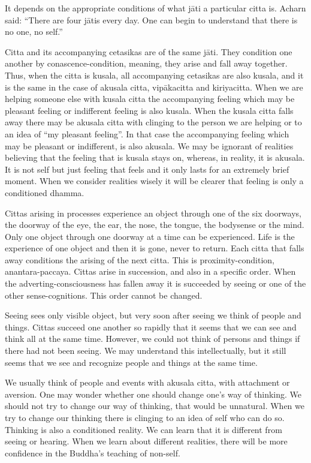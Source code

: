 It depends on the appropriate conditions of what jāti a particular citta
is. Acharn said: ``There are four jātis every day. One can begin to
understand that there is no one, no self.''

Citta and its accompanying cetasikas are of the same jāti. They
condition one another by conascence-condition, meaning, they arise and
fall away together. Thus, when the citta is kusala, all accompanying
cetasikas are also kusala, and it is the same in the case of akusala
citta, vipākacitta and kiriyacitta. When we are helping someone else
with kusala citta the accompanying feeling which may be pleasant feeling
or indifferent feeling is also kusala. When the kusala citta falls away
there may be akusala citta with clinging to the person we are helping or
to an idea of ``my pleasant feeling''. In that case the accompanying
feeling which may be pleasant or indifferent, is also akusala. We may be
ignorant of realities believing that the feeling that is kusala stays
on, whereas, in reality, it is akusala. It is not self but just feeling
that feels and it only lasts for an extremely brief moment. When we
consider realities wisely it will be clearer that feeling is only a
conditioned dhamma.

Cittas arising in processes experience an object through one of the six
doorways, the doorway of the eye, the ear, the nose, the tongue, the
bodysense or the mind. Only one object through one doorway at a time can
be experienced. Life is the experience of one object and then it is
gone, never to return. Each citta that falls away conditions the arising
of the next citta. This is proximity-condition, anantara-paccaya. Cittas
arise in succession, and also in a specific order. When the
adverting-consciousness has fallen away it is succeeded by seeing or one
of the other sense-cognitions. This order cannot be changed.

Seeing sees only visible object, but very soon after seeing we think of
people and things. Cittas succeed one another so rapidly that it seems
that we can see and think all at the same time. However, we could not
think of persons and things if there had not been seeing. We may
understand this intellectually, but it still seems that we see and
recognize people and things at the same time.

We usually think of people and events with akusala citta, with
attachment or aversion. One may wonder whether one should change one's
way of thinking. We should not try to change our way of thinking, that
would be unnatural. When we try to change our thinking there is clinging
to an idea of self who can do so. Thinking is also a conditioned
reality. We can learn that it is different from seeing or hearing. When
we learn about different realities, there will be more confidence in the
Buddha's teaching of non-self.

